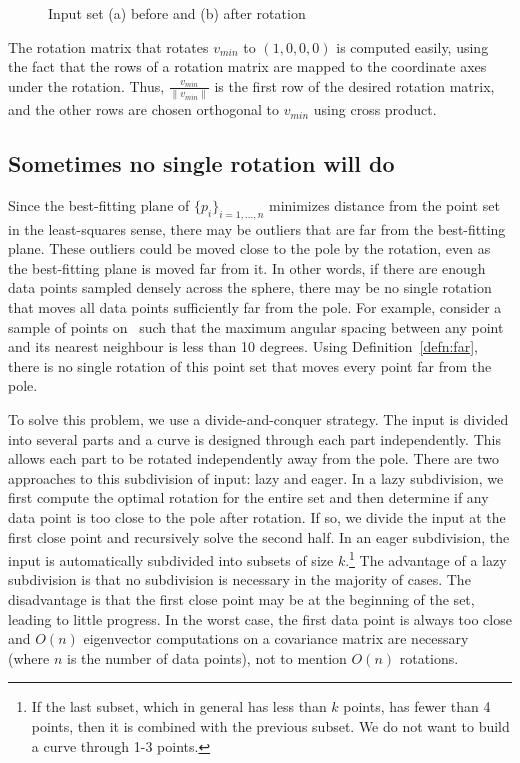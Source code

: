 \begin{figure}
\vspace{1in}
\caption{Input set (a) before and (b) after rotation}
\label{fig:avoid}
\end{figure}

The rotation matrix that rotates $v_{min}$
to $(1,0,0,0)$ is computed easily, using the fact that the rows
of a rotation matrix are mapped to the coordinate axes under the
rotation.
Thus, $\frac{v_{min}}{\|v_{min}\|}$ is the first row of the desired rotation matrix,
and the other rows are chosen orthogonal to $v_{min}$ using
cross product.

\subsection{Sometimes no single rotation will do}
\label{sec:divandconq}

Since the best-fitting plane of $\{p_i\}_{i=1,\ldots,n}$ 
minimizes distance from the point set in the least-squares sense,
there may be outliers that are far from the best-fitting plane.
These outliers could be moved close to the pole by the rotation,
even as the best-fitting plane is moved far from it.
In other words,
if there are enough data points sampled densely across 
the sphere, there may be no single rotation that 
moves all data points sufficiently far from the pole.
For example, consider a sample of points on \ such that
the maximum angular spacing between any point and its nearest neighbour
is less than 10 degrees.
Using Definition~\ref{defn:far},
there is no single rotation of this point set that moves every point far
from the pole.

To solve this problem, we use a divide-and-conquer strategy.
The input is divided into several parts and a curve is designed through
each part independently. 
This allows each part to be rotated independently away from the pole.
There are two approaches to this subdivision of input: lazy and eager.
In a lazy subdivision, we first compute the optimal rotation for the entire
set and then determine if any data point is too close to the pole
after rotation.
If so, we divide the input at the first close point and recursively
solve the second half.
In an eager subdivision,
the input is automatically subdivided into subsets of size $k$.\footnote{If the
	last subset, which in general has less than $k$ points,
	has fewer than 4 points, then it is combined with the previous subset.
	We do not want to build a curve through 1-3 points.}
The advantage of a lazy subdivision is that no subdivision is necessary
in the majority of cases.
The disadvantage is that the first close point may be at the beginning of the set,
leading to little progress.
In the worst case, the first data point is always too close 
and $O(n)$ eigenvector computations
on a covariance matrix are necessary (where $n$ is the number of data points),
not to mention $O(n)$ rotations.

